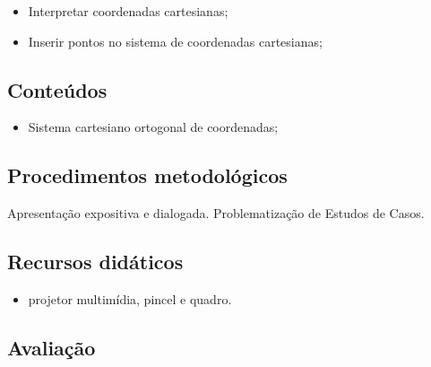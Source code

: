 \documentclass[oneside,a4paper,12pt]{article}
\begin{document}
    \begin{itemize}
      
      \item Interpretar coordenadas cartesianas;
      \item Inserir pontos no sistema de coordenadas cartesianas;
      
    \end{itemize}
  
  \begin{snugshade}
  \section{Conteúdos} %
  \end{snugshade}

    \begin{itemize}
      
      \item Sistema cartesiano ortogonal de coordenadas;
      
    \end{itemize}

  \begin{snugshade}
  \section{Procedimentos metodológicos} %
  \end{snugshade}

	Apresentação expositiva e dialogada. Problematização de Estudos de Casos.
	  
  \begin{snugshade}
  \section{Recursos didáticos} %
  \end{snugshade}
  
    \begin{itemize}

	  \item projetor multimídia, pincel e quadro.
	  
    \end{itemize}
  
  \begin{snugshade}
  \section{Avaliação} %
  \end{snugshade}
\end{document}
